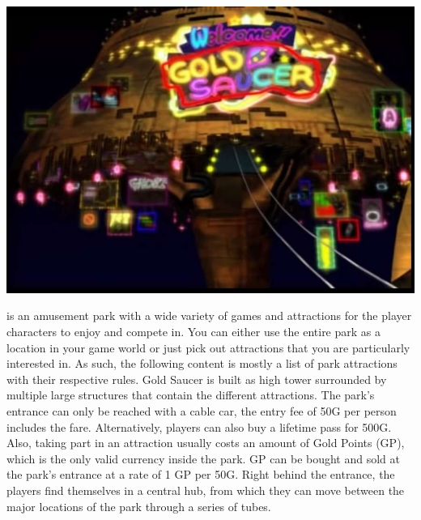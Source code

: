 %
%
%
%
%
% 
%
%
\begin{center} \includegraphics[width=\columnwidth]{./art/goldsaucer/goldsaucer.jpg} \end{center}
%
\vfill
%
 is an amusement park with a wide variety of games and attractions for the player characters to enjoy and compete in.
You can either use the entire park as a location in your game world or just pick out attractions that you are particularly interested in.
As such, the following content is mostly a list of park attractions with their respective rules.
Gold Saucer is built as high tower surrounded by multiple large structures that contain the different attractions.
The park's entrance can only be reached with a cable car, the entry fee of 50G per person includes the fare.
Alternatively, players can also buy a lifetime pass for 500G.
Also, taking part in an attraction usually costs an amount of Gold Points (GP), which is the only valid currency inside the park.
GP can be bought and sold at the park's entrance at a rate of 1 GP per 50G.
Right behind the entrance, the players find themselves in a central hub, from which they can move between the major locations of the park through a series of tubes.
%
\vfill
%
